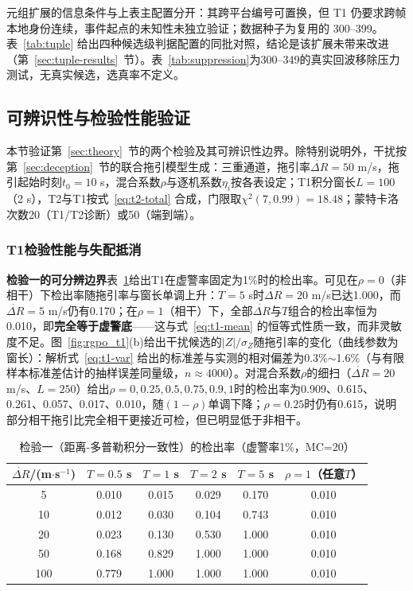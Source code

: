 \documentclass[UTF8,a4paper,zihao=-4]{ctexart}
\begin{document}
元组扩展的信息条件与上表主配置分开：其跨平台编号可置换，但 T1 仍要求跨帧本地身份连续，事件起点的未知性未独立验证；数据种子为复用的 300--399。表~\ref{tab:tuple} 给出四种候选级判据配置的同批对照，结论是该扩展未带来改进（第~\ref{sec:tuple-results}~节）。表~\ref{tab:suppression}为300--349的真实回波移除压力测试，无真实候选，选真率不定义。




\subsection{可辨识性与检验性能验证}\label{sec:test-results}
本节验证第~\ref{sec:theory}~节的两个检验及其可辨识性边界。除特别说明外，干扰按第~\ref{sec:deception}~节的联合拖引模型生成：三重通道，拖引率\(\dot{\Delta R}=50\) m/s，拖引起始时刻\(t_0=10\) s，混合系数\(\rho\)与逐机系数\(\eta_i\)按各表设定；T1积分窗长\(L=100\)（2 s），T2与T1按式~\eqref{eq:t2-total} 合成，门限取\(\chi^2(7,0.99)=18.48\)；蒙特卡洛次数20（T1/T2诊断）或50（端到端）。



\subsubsection{T1检验性能与失配抵消}\label{sec:test-t1}
\noindent\textbf{检验一的可分辨边界}\quad 表~\ref{tab:t1roc}给出T1在虚警率固定为1\%时的检出率。可见在\(\rho=0\)（非相干）下检出率随拖引率与窗长单调上升：\(T=5\) s时\(\dot{\Delta R}=20\) m/s已达1.000，而\(\dot{\Delta R}=5\) m/s仍有0.170；在\(\rho=1\)（相干）下，全部\(\dot{\Delta R}\)与\(T\)组合的检出率恒为0.010，即\textbf{完全等于虚警底}——这与式~\eqref{eq:t1-mean} 的恒等式性质一致，而非灵敏度不足。图~\ref{fig:rgpo_t1}(b)给出干扰候选的\(|Z|/\sigma_Z\)随拖引率的变化（曲线参数为窗长）：解析式~\eqref{eq:t1-var} 给出的标准差与实测的相对偏差为0.3\%\(\sim\)1.6\%（与有限样本标准差估计的抽样误差同量级，\(n\approx4000\)）。对混合系数\(\rho\)的细扫（\(\dot{\Delta R}=20\) m/s、\(L=250\)）给出\(\rho=0,0.25,0.5,0.75,0.9,1\)时的检出率为0.909、0.615、0.261、0.057、0.017、0.010，随\((1-\rho)\)单调下降；\(\rho=0.25\)时仍有0.615，说明部分相干拖引比完全相干更接近可检，但已明显低于非相干。

\begin{table}[htbp]
\centering
\caption{检验一（距离-多普勒积分一致性）的检出率（虚警率1\%，MC=20）}\label{tab:t1roc}
\begin{tabular}{@{}cccccc@{}}
\toprule
\(\dot{\Delta R}\)/(m$\cdot$s$^{-1}$) & \(T=0.5\) s & \(T=1\) s & \(T=2\) s & \(T=5\) s & \(\rho=1\)（任意\(T\)）\\
\midrule
5   & 0.010 & 0.015 & 0.029 & 0.170 & 0.010\\
10  & 0.012 & 0.030 & 0.104 & 0.743 & 0.010\\
20  & 0.023 & 0.130 & 0.530 & 1.000 & 0.010\\
50  & 0.168 & 0.829 & 1.000 & 1.000 & 0.010\\
100 & 0.779 & 1.000 & 1.000 & 1.000 & 0.010\\
\bottomrule
\end{tabular}
\end{table}
\end{document}
